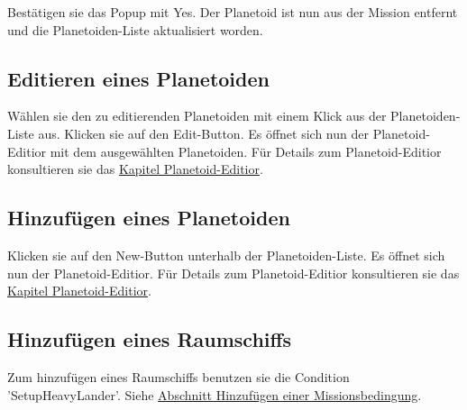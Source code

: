 Bestätigen sie das Popup mit Yes.
Der Planetoid ist nun aus der Mission entfernt und die Planetoiden-Liste aktualisiert worden.

\subsection{Editieren eines Planetoiden}
Wählen sie den zu editierenden Planetoiden mit einem Klick aus der Planetoiden-Liste aus.
Klicken sie auf den Edit-Button.
Es öffnet sich nun der Planetoid-Editior mit dem ausgewählten Planetoiden.
Für Details zum Planetoid-Editior konsultieren sie das \hyperlink{planetoideditor}{Kapitel Planetoid-Editior}.

\subsection{Hinzufügen eines Planetoiden}
\unimplemented
Klicken sie auf den New-Button unterhalb der Planetoiden-Liste.
Es öffnet sich nun der Planetoid-Editior.
Für Details zum Planetoid-Editior konsultieren sie das \hyperlink{planetoideditor}{Kapitel Planetoid-Editior}.

\subsection{Hinzufügen eines Raumschiffs}
Zum hinzufügen eines Raumschiffs benutzen sie die Condition 'SetupHeavyLander'.
Siehe \hyperlink{addcondition}{Abschnitt Hinzufügen einer Missionsbedingung}.